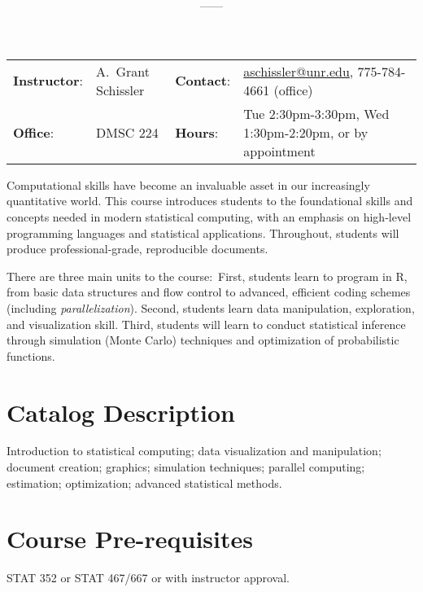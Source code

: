 \documentclass[11pt,onecolumn]{article}
\title{\textbf{\coursename}}
\author{{\semester}---{\roomnumb}---{\classtimes}}
\date{}
\makeatletter
\newcommand{\myname}{A.~Grant Schissler}
\newcommand{\myemail}{aschissler@unr.edu}
\newcommand{\office}{DMSC 224}
\newcommand{\officehours}{Tue 2:30pm-3:30pm, Wed 1:30pm-2:20pm, or by appointment}
\makeatother
\begin{document}
\maketitle

\vspace{-0.25in}
\noindent\makebox[\linewidth]{\rule{\textwidth}{1pt}}

\begin{center}
\begin{tabular}{llll}
\textbf{Instructor}:&\myname & \textbf{Contact}:&\href{mailto:\myemail}{\myemail}, 775-784-4661 (office)\\
\textbf{Office}:&\office & \textbf{Hours}:&\officehours\\
\end{tabular}
\end{center}

Computational skills have become an invaluable asset in our increasingly quantitative world. This course introduces students to the foundational skills and concepts needed in modern statistical computing, with an emphasis on high-level programming languages and statistical applications. Throughout, students will produce professional-grade, reproducible documents.

There are three main units to the course:~First, students learn to program in R, from basic data structures and flow control to advanced, efficient coding schemes (including \textit{parallelization}). Second, students learn data manipulation, exploration, and visualization skill. Third, students will learn to conduct statistical inference through simulation (Monte Carlo) techniques and optimization of probabilistic functions.

\section*{Catalog Description}
Introduction to statistical computing; data visualization and manipulation; document creation; graphics; simulation techniques; parallel computing; estimation; optimization; advanced statistical methods.

\section*{Course Pre-requisites}
STAT 352 or STAT 467/667 or with instructor approval.
\end{document}
